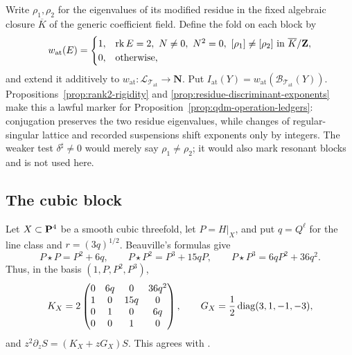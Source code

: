 Write \(\rho_1,\rho_2\) for the eigenvalues of its modified residue in the
fixed algebraic closure \(\overline K\) of the generic coefficient field.
Define the fold on each block by
\begin{equation}
 w_{\mathrm{at}}(E)=
 \begin{cases}
 1,&\operatorname{rk} E=2,\ N\ne0,\ N^2=0,\
      [\rho_1]\ne[\rho_2]\text{ in }\overline K/\mathbf Z,\\
 0,&\text{otherwise},
 \end{cases}
 \label{eq:atomic-fold}
\end{equation}
and extend it additively to
\(w_{\mathrm{at}}:\mathcal L_{\mathcal T_{\mathrm{at}}}\to\mathbf N\).  Put
\(I_{\mathrm{at}}(Y)=
w_{\mathrm{at}}(\mathcal B_{\mathcal T_{\mathrm{at}}}(Y))\).
Propositions~\ref{prop:rank2-rigidity} and
\ref{prop:residue-discriminant-exponents} make this a lawful marker for
Proposition~\ref{prop:qdm-operation-ledgers}: conjugation preserves the two
residue eigenvalues, while changes of regular-singular lattice and recorded
suspensions shift exponents only by integers.  The weaker test
\(\delta^\sharp\ne0\) would merely say \(\rho_1\ne\rho_2\); it would also mark
resonant blocks and is not used here.

\subsection{The cubic block}
\label{subsec:shared-cubic-packet}

Let \(X\subset\mathbf P^4\) be a smooth cubic threefold, let \(P=H|_X\), and put
\(q=Q^\ell\) for the line class and \(r=(3q)^{1/2}\).  Beauville's formulas
give \cite[main theorem and (2.1)--(2.3)]{Beauville}
\begin{equation}
 P\star P=P^2+6q,\qquad
 P\star P^2=P^3+15qP,\qquad
 P\star P^3=6qP^2+36q^2.
 \label{eq:beauville-cubic-products}
\end{equation}
Thus, in the basis \((1,P,P^2,P^3)\),
\begin{equation}
 K_X=2\begin{pmatrix}
 0&6q&0&36q^2\\1&0&15q&0\\0&1&0&6q\\0&0&1&0
 \end{pmatrix},
 \qquad G_X=\frac12\operatorname{diag}(3,1,-1,-3),
 \label{eq:cubic-small-even-connection}
\end{equation}
and \(z^2\partial_zS=(K_X+zG_X)S\).  This agrees with
\cite[Section~3]{Cai}.

